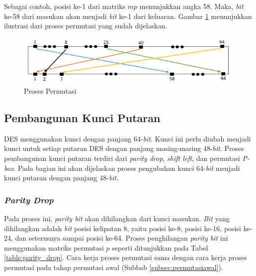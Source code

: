 Sebagai contoh, posisi ke-1 dari matriks \begin{math}mp\end{math} menunjukkan angka 58. Maka, \textit{bit} ke-58 dari masukan akan menjadi \textit{bit} ke-1 dari keluaran. Gambar \ref{fig:prosespermutasi} menunjukkan ilustrasi dari proses permutasi yang sudah dijelaskan.

\begin{figure}[H]
\includegraphics[scale=0.8]{Gambar/proses_permutasi_awal}
\centering
\caption{Proses Permutasi}\label{fig:prosespermutasi}
\end{figure}

\subsection{Pembangunan Kunci Putaran}

DES menggunakan kunci dengan panjang 64-\textit{bit}. Kunci ini perlu diubah menjadi kunci untuk setiap putaran DES dengan panjang masing-masing 48-\textit{bit}. Proses pembangunan kunci putaran terdiri dari \textit{parity drop}, \textit{shift left}, dan permutasi \textit{P-box}. Pada bagian ini akan dijelaskan proses pengubahan kunci 64-\textit{bit} menjadi kunci putaran dengan panjang 48-\textit{bit}.

\subsubsection{\textit{Parity Drop}}

Pada proses ini, \textit{parity bit} akan dihilangkan dari kunci masukan. \textit{Bit} yang dihilangkan adalah \textit{bit} posisi kelipatan 8, yaitu posisi ke-8, posisi ke-16, posisi ke-24, dan seterusnya sampai posisi ke-64. Proses penghilangan \textit{parity bit} ini menggunakan matriks permutasi \begin{math}p\end{math} seperti ditunjukkan pada Tabel \ref{table:parity_drop}. Cara kerja proses permutasi sama dengan cara kerja proses permutasi pada tahap permutasi awal (Subbab \ref{subsec:permutasiawal}).

